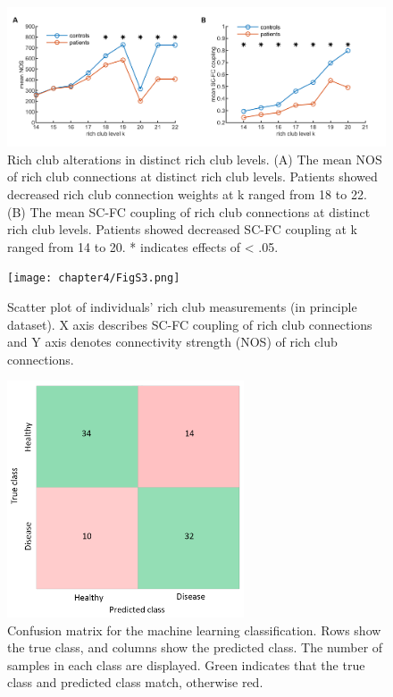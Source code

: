 \begin{refsection}
\begin{figure}[H]
\centering
  \includegraphics[width=\linewidth]{images/rcsczFigS2.png}
  \caption{\small Rich club alterations in distinct rich club levels. (A) The mean NOS of rich club connections at distinct rich club levels. Patients showed decreased rich club connection weights at k ranged from 18 to 22. (B) The mean SC-FC coupling of rich club connections at distinct rich club levels. Patients showed decreased SC-FC coupling at k ranged from 14 to 20. * indicates effects of \pval < .05.
}
  \label{figureS2:range}
\end{figure}

\begin{figure}[H]
\centering
  \texttt{[image: chapter4/FigS3.png]}
  \caption{\small Scatter plot of individuals’ rich club measurements (in principle dataset). X axis describes SC-FC coupling of rich club connections and Y axis denotes connectivity strength (NOS) of rich club connections.
}
  \label{figureS3:scatter_scfc_nos}
\end{figure}

\begin{figure}[H]
\centering
  \includegraphics[width=7cm]{images/rcsczFigS4.png}
  \caption{\small Confusion matrix for the machine learning classification. Rows show the true class, and columns show the predicted class. The number of samples in each class are displayed. Green indicates that the true class and predicted class match, otherwise red.
}
  \label{figureS4:confusionmatrix}
\end{figure}



\end{refsection}


